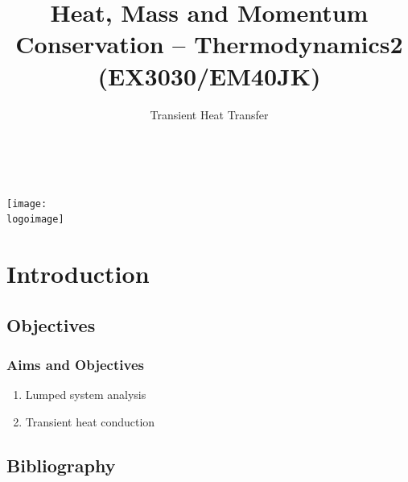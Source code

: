\documentclass[10pt,compress]{beamer}
\institute{School of Engineering}
\title{Heat, Mass and Momentum Conservation -- Thermodynamics2 (EX3030/EM40JK)}
\subtitle{Transient Heat Transfer}
\date[ ]{ }
\author[\shortname]{%
  \fullname\\\ttfamily{\emailaddress}
}
\newcommand{\logoimage}{../FigBanner/UoAHorizBanner}
\begin{document}
\begin{frame}
  \titlepage
  \vfill%
  \begin{center}
    \texttt{[image: \\logoimage]}
  \end{center}
\end{frame}




\section{Introduction} 


\subsection{Objectives}

\begin{frame}
 \frametitle{Aims and Objectives}
   \begin{enumerate}
     \item Lumped system analysis
     \item Transient heat conduction
   \end{enumerate}
\end{frame}


\subsection{Bibliography} 
\end{document}

